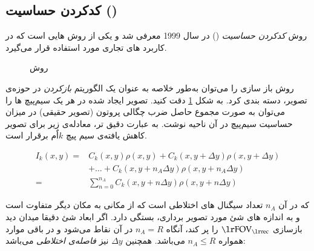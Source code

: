 \FloatBarrier
\subsection{کدکردن حساسیت ()}

روش \textit{کدکردن حساسیت}
()
در سال 1999 معرفی شد\cite{SENSE-1999} و یکی از روش هایی است که در کاربرد های تجاری مورد استفاده قرار می‌گیرد. 

\begin{figure}
	\centering
	\removevspace[1]
	\caption{روش }
	\label{fig:sense-rec-image}
\end{figure}


روش باز سازی 
را می‌توان به‌طور خلاصه به عنوان یک الگوریتم \textit{بازکردن}
در حوزه‌ی تصویر، دسته بندی کرد.
\cite{SMASH-SENSE-PILS-GRAPPA--2004}
به شکل \ref{fig:sense-rec-image}
دقت کنید. 
 تصویر ایجاد شده در هر یک سیم‌پیچ ها را می‌توان به صورت مجموع حاصل ضرب چگالی پروتون (تصویر حقیقی) در میزان حساسیت سیم‌پیچ در آن ناحیه نوشت. به عبارت دقیق تر، معادله‌ی زیر برای تصویر کاهش یافته‌ی سیم پیچ $k$اٌم برقرار است.

\removevspace
\begin{equation}\label{eq:I_k=sum_0^nA}
	\begin{aligned}
		I_k(x,y) = & C_k(x, y) \rho(x,y) + C_k(x, y + \Delta y) \rho(x, y + \Delta y) \\
				   & + \dots + C_k(x, y + n_A \Delta y) \rho(x, y + n_A \Delta y) \\
				 = & \sum_{n=0}^{n_A} C_k(x, y + n \Delta y) \rho(x, y + n \Delta y )
	\end{aligned}
\end{equation}

که در آن $n_A$ تعداد سیگنال های اختلاطی است که از مکانی به مکان دیگر متفاوت است و به اندازه های شئ مورد تصویر برداری، بستگی دارد. اگر ابعاد شئ دقیقا میدان دید بازسازی
 $\lrtext{FOV}_{\lrtext{rec}}$
 را پر کند، آنگاه $n_A = R$ در آن نقاط می‌شود و در باقی موارد همواره $n_A \le R$ می‌باشد. 
 همچنین $\Delta y$ نیز \textit{فاصله‌ی اختلاطی} 
می‌باشد:

